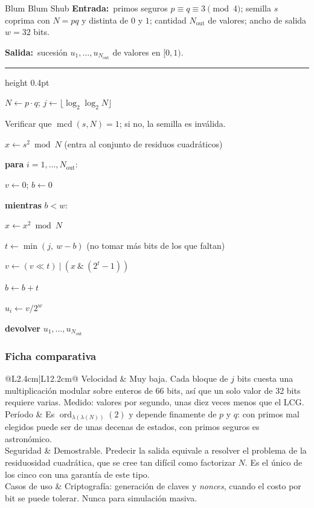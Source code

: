\documentclass[11pt,letterpaper]{article}
\makeatletter
\DeclareMathOperator{\mcd}{mcd}
\DeclareMathOperator{\ord}{ord}
\newcommand{\entrada}[1]{\textbf{\small Entrada:}\ \small #1\par}
\newcommand{\salida}[1]{\textbf{\small Salida:}\ \small #1\par
  \vspace{3pt}\textcolor{marco}{\hrule height 0.4pt}\vspace{5pt}}
\newcommand{\ficha}[6]{%
\begin{table}[htbp]\centering\small
\caption{#2}\label{#1}
\begin{tabular}{@{}L{2.4cm}|L{12.2cm}@{}}
\toprule
Velocidad    & #3 \\ \addlinespace
Período      & #4 \\ \addlinespace
Seguridad    & #5 \\ \addlinespace
Casos de uso & #6 \\
\bottomrule
\end{tabular}
\end{table}}
\makeatother
\begin{document}
\begin{pseudo}{Blum Blum Shub}
\entrada{primos seguros $p \equiv q \equiv 3 \pmod 4$; semilla $s$ coprima
con $N = pq$ y distinta de $0$ y $1$; cantidad $N_{\text{out}}$ de valores;
ancho de salida $w = 32$ bits.}
\salida{sucesión $u_1,\dots,u_{N_{\text{out}}}$ de valores en $[0,1)$.}
\begin{pasos}
  \item $N \gets p \cdot q$; \quad $j \gets \lfloor \log_2 \log_2 N \rfloor$
  \item Verificar que $\mcd(s, N) = 1$; si no, la semilla es inválida.
  \item $x \gets s^2 \bmod N$ \quad \textcolor{gris}{\small(entra al conjunto de residuos cuadráticos)}
  \item \textbf{para} $i = 1, \dots, N_{\text{out}}$:
  \begin{pasos}
     \item $v \gets 0$; \quad $b \gets 0$
     \item \textbf{mientras} $b < w$:
     \begin{pasos}
       \item $x \gets x^2 \bmod N$
       \item $t \gets \min(j,\ w - b)$ \quad \textcolor{gris}{\small(no tomar más bits de los que faltan)}
       \item $v \gets (v \ll t)\ |\ (x\ \&\ (2^{t}-1))$
       \item $b \gets b + t$
     \end{pasos}
     \item $u_i \gets v / 2^{w}$
  \end{pasos}
  \item \textbf{devolver} $u_1, \dots, u_{N_{\text{out}}}$
\end{pasos}
\end{pseudo}

\subsubsection{Ficha comparativa}

\ficha{tab:fichaBBS}{Características de Blum Blum Shub.}
{Muy baja. Cada bloque de $j$ bits cuesta una multiplicación modular sobre
enteros de 66 bits, así que un solo valor de 32 bits requiere varias. Medido:
\velBBS{} valores por segundo, unas diez veces menos que el LCG.}
{Es $\ord_{\lambda(\lambda(N))}(2)$ y depende finamente de $p$ y $q$: con
primos mal elegidos puede ser de unas decenas de estados, con primos seguros
es astronómico.}
{Demostrable. Predecir la salida equivale a resolver el problema de la
residuosidad cuadrática, que se cree tan difícil como factorizar $N$. Es el
único de los cinco con una garantía de este tipo.}
{Criptografía: generación de claves y \emph{nonces}, cuando el costo por bit
se puede tolerar. Nunca para simulación masiva.}
\end{document}
